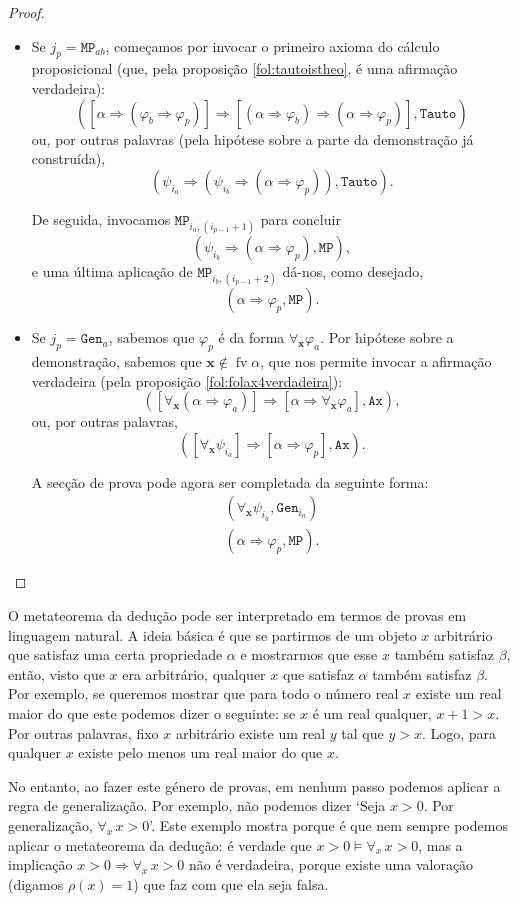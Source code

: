 \documentclass{report}
\theoremstyle{definition}
\theoremstyle{remark}
\renewcommand{\bf}[1]{\mathbf{#1}}
\DeclareMathOperator{\fv}{fv}
\newcommand{\imply}{\mathbin{\Rightarrow}}
\begin{document}
\begin{proof}
\begin{itemize}
	\item Se $j_p = \mathtt{MP}_{ab}$, começamos por invocar o primeiro axioma do cálculo proposicional (que, pela proposição \ref{fol:tautoistheo}, é uma afirmação verdadeira):
	\[([\alpha \imply (\varphi_b \imply \varphi_p)] \imply [(\alpha \imply \varphi_b) \imply (\alpha \imply \varphi_p)], \texttt{Tauto})\]
	ou, por outras palavras (pela hipótese sobre a parte da demonstração já construída),
	\[(\psi_{i_a} \imply (\psi_{i_b} \imply (\alpha \imply \varphi_p)), \texttt{Tauto}).\]
	
	De seguida, invocamos $\mathtt{MP}_{i_a, (i_{p-1}+1)}$ para concluir
	\[(\psi_{i_b} \imply (\alpha \imply \varphi_p), \texttt{MP}),\]
	e uma última aplicação de $\mathtt{MP}_{i_b, (i_{p-1}+2)}$ dá-nos, como desejado,
	\[(\alpha \imply \varphi_p, \texttt{MP}).\]
	
	\item Se $j_p = \mathtt{Gen}_a$, sabemos que $\varphi_p$ é da forma $\forall_{\bf x} \varphi_a$. Por hipótese sobre a demonstração, sabemos que $\bf x \not \in \fv \alpha$, que nos permite invocar a afirmação verdadeira (pela proposição \ref{fol:folax4verdadeira}):
	\[([\forall_{\bf x} (\alpha \imply \varphi_a)] \imply [\alpha \imply \forall_{\bf x} \varphi_a], \mathtt{Ax}),\]
	ou, por outras palavras,
	\[([\forall_{\bf x} \psi_{i_a}] \imply [\alpha \imply \varphi_p], \mathtt{Ax}).\]
	
	A secção de prova pode agora ser completada da seguinte forma:
	\begin{gather*}
	(\forall_{\bf x} \psi_{i_a}, \mathtt{Gen}_{i_a})\\
	(\alpha \imply \varphi_p, \mathtt{MP}).
	\end{gather*}
	\end{itemize}
	\end{proof}
	
	O metateorema da dedução pode ser interpretado em termos de provas em linguagem natural. A ideia básica é que se partirmos de um objeto $x$ arbitrário que satisfaz uma certa propriedade $\alpha$ e mostrarmos que esse $x$ também satisfaz $\beta$, então, visto que $x$ era arbitrário, qualquer $x$ que satisfaz $\alpha$ também satisfaz $\beta$. Por exemplo, se queremos mostrar que para todo o número real $x$ existe um real maior do que este podemos dizer o seguinte: se $x$ é um real qualquer, $x+1>x$. Por outras palavras, fixo $x$ arbitrário existe um real $y$ tal que $y > x$. Logo, para qualquer $x$ existe pelo menos um real maior do que $x$.

	No entanto, ao fazer este género de provas, em nenhum passo podemos aplicar a regra de generalização. Por exemplo, não podemos dizer `Seja $x > 0$. Por generalização, $\forall_x \, x>0$'. Este exemplo mostra porque é que nem sempre podemos aplicar o metateorema da dedução: é verdade que $x > 0 \vDash \forall_x\, x>0$, mas a implicação $x > 0 \imply \forall_x \, x > 0$ não é verdadeira, porque existe uma valoração (digamos $\rho(x) = 1$) que faz com que ela seja falsa.
	
\end{document}
